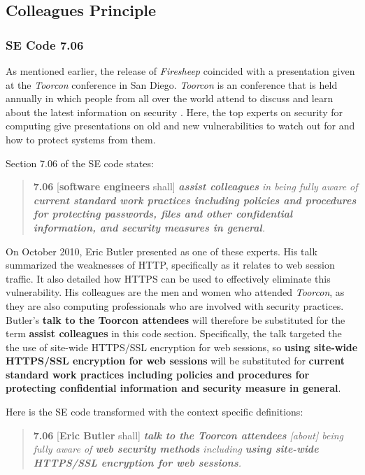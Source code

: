 \documentclass[11pt]{article}
\begin{document}
\begin{multicols}{2}
\subsection{Colleagues Principle}
\subsubsection{SE Code 7.06}
As mentioned earlier, the release of \emph{Firesheep} coincided with a presentation given at the \emph{Toorcon} conference in San Diego. \emph{Toorcon} is an conference that is held annually in which people from all over the world attend to discuss and learn about the latest information on security \cite{toorcon}. Here, the top experts on security for computing give presentations on old and new vulnerabilities to watch out for and how to protect systems from them.

Section 7.06 of the SE code states:

\begin{quote}
  \textbf{7.06} [\textbf{software engineers} shall] \emph{\textbf{assist colleagues} in being fully aware of \textbf{current standard work practices including policies and procedures for protecting passwords, files and other confidential information, and security measures in general}.} \cite{se_code}
\end{quote}

On October 2010, Eric Butler presented as one of these experts. His talk summarized the weaknesses of HTTP, specifically as it relates to web session traffic. It also detailed how HTTPS can be used to effectively eliminate this vulnerability. His colleagues are the men and women who attended \emph{Toorcon}, as they are also computing professionals who are involved with security practices. Butler's \textbf{talk to the Toorcon attendees} will therefore be substituted for the term \textbf{assist colleagues} in this code section. Specifically, the talk targeted the the use of site-wide HTTPS/SSL encryption for web sessions, so \textbf{using site-wide HTTPS/SSL encryption for web sessions} will be substituted for \textbf{current standard work  practices including policies and procedures for protecting confidential information and security measure in general}.

Here is the SE code transformed with the context specific definitions:

\begin{quote}
  \textbf{7.06} [\textbf{Eric Butler} shall] \emph{\textbf{talk to the Toorcon attendees} [about] being fully aware of \textbf{web security methods} including \textbf{using site-wide HTTPS/SSL encryption for web sessions}.}
\end{quote}


\end{multicols}
\end{document}
